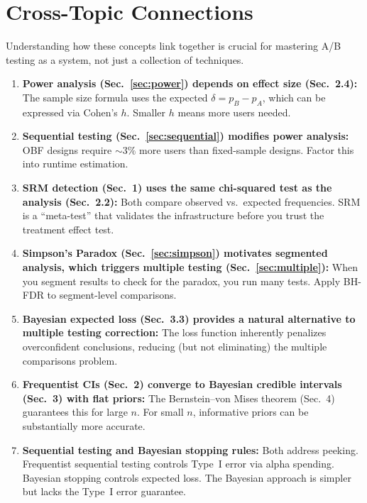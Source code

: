\documentclass[11pt,a4paper]{article}
\begin{document}
\section{Cross-Topic Connections}

Understanding how these concepts link together is crucial for mastering A/B testing as a system, not just a collection of techniques.

\begin{enumerate}
  \item \textbf{Power analysis (Sec.~\ref{sec:power}) depends on effect size (Sec.~2.4):} The sample size formula uses the expected $\delta = p_B - p_A$, which can be expressed via Cohen's $h$. Smaller $h$ means more users needed.

  \item \textbf{Sequential testing (Sec.~\ref{sec:sequential}) modifies power analysis:} OBF designs require ${\sim}3\%$ more users than fixed-sample designs. Factor this into runtime estimation.

  \item \textbf{SRM detection (Sec.~1) uses the same chi-squared test as the analysis (Sec.~2.2):} Both compare observed vs.\ expected frequencies. SRM is a ``meta-test'' that validates the infrastructure before you trust the treatment effect test.

  \item \textbf{Simpson's Paradox (Sec.~\ref{sec:simpson}) motivates segmented analysis, which triggers multiple testing (Sec.~\ref{sec:multiple}):} When you segment results to check for the paradox, you run many tests. Apply BH-FDR to segment-level comparisons.

  \item \textbf{Bayesian expected loss (Sec.~3.3) provides a natural alternative to multiple testing correction:} The loss function inherently penalizes overconfident conclusions, reducing (but not eliminating) the multiple comparisons problem.

  \item \textbf{Frequentist CIs (Sec.~2) converge to Bayesian credible intervals (Sec.~3) with flat priors:} The Bernstein--von Mises theorem (Sec.~4) guarantees this for large $n$. For small $n$, informative priors can be substantially more accurate.

  \item \textbf{Sequential testing and Bayesian stopping rules:} Both address peeking. Frequentist sequential testing controls Type~I error via alpha spending. Bayesian stopping controls expected loss. The Bayesian approach is simpler but lacks the Type~I error guarantee.
\end{enumerate}
\end{document}
